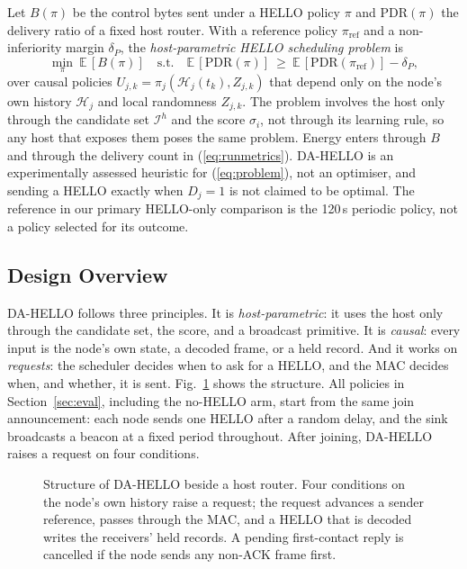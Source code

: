 Let $B(\pi)$ be the control bytes sent under a HELLO policy $\pi$ and $\mathrm{PDR}(\pi)$ the delivery ratio of a fixed host router. With a reference policy $\pi_{\mathrm{ref}}$ and a non-inferiority margin $\delta_P$, the \emph{host-parametric HELLO scheduling problem} is
\begin{equation}
\min_{\pi}\ \mathbb{E}\,[B(\pi)]\quad\text{s.t.}\quad \mathbb{E}\,[\mathrm{PDR}(\pi)]\ \ge\ \mathbb{E}\,[\mathrm{PDR}(\pi_{\mathrm{ref}})]-\delta_P,
\label{eq:problem}
\end{equation}
over causal policies $U_{j,k}=\pi_j(\mathcal{H}_j(t_k),Z_{j,k})$ that depend only on the node's own history $\mathcal{H}_j$ and local randomness $Z_{j,k}$. The problem involves the host only through the candidate set $\mathcal{I}^h$ and the score $\sigma_i$, not through its learning rule, so any host that exposes them poses the same problem. Energy enters through $B$ and through the delivery count in (\ref{eq:runmetrics}). DA-HELLO is an experimentally assessed heuristic for (\ref{eq:problem}), not an optimiser, and sending a HELLO exactly when $D_j=1$ is not claimed to be optimal. The reference in our primary HELLO-only comparison is the 120\,s periodic policy, not a policy selected for its outcome.

\subsection{Design Overview}
\label{sec:overview}
DA-HELLO follows three principles. It is \emph{host-parametric}: it uses the host only through the candidate set, the score, and a broadcast primitive. It is \emph{causal}: every input is the node's own state, a decoded frame, or a held record. And it works on \emph{requests}: the scheduler decides when to ask for a HELLO, and the MAC decides when, and whether, it is sent. Fig.~\ref{fig:flow} shows the structure. All policies in Section~\ref{sec:eval}, including the no-HELLO arm, start from the same join announcement: each node sends one HELLO after a random delay, and the sink broadcasts a beacon at a fixed period throughout. After joining, DA-HELLO raises a request on four conditions.

\begin{figure}[t]
\centering

\caption{Structure of DA-HELLO beside a host router. Four conditions on the node's own history raise a request; the request advances a sender reference, passes through the MAC, and a HELLO that is decoded writes the receivers' held records. A pending first-contact reply is cancelled if the node sends any non-ACK frame first.}
\label{fig:flow}
\end{figure}

